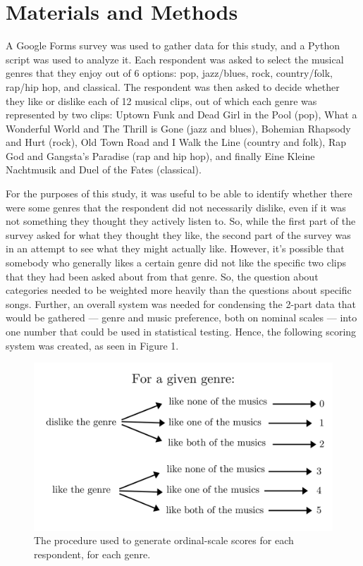\documentclass[12pt]{report}
\begin{document}
\chapter*{Materials and Methods}
A Google Forms survey was used to gather data for this study, and a Python script was used to analyze it. Each respondent was asked to select the musical genres that they enjoy out of 6 options: pop, jazz/blues, rock, country/folk, rap/hip hop, and classical. The respondent was then asked to decide whether they like or dislike each of 12 musical clips, out of which each genre was represented by two clips: Uptown Funk and Dead Girl in the Pool (pop), What a Wonderful World and The Thrill is Gone (jazz and blues), Bohemian Rhapsody and Hurt (rock), Old Town Road and I Walk the Line (country and folk), Rap God and Gangsta's Paradise (rap and hip hop), and finally Eine Kleine Nachtmusik and Duel of the Fates (classical).

For the purposes of this study, it was useful to be able to identify whether there were some genres that the respondent did not necessarily dislike, even if it was not something they thought they actively listen to. So, while the first part of the survey asked for what they thought they like, the second part of the survey was in an attempt to see what they might actually like. However, it's possible that somebody who generally likes a certain genre did not like the specific two clips that they had been asked about from that genre. So, the question about categories needed to be weighted more heavily than the questions about specific songs. Further, an overall system was needed for condensing the 2-part data that would be gathered --- genre and music preference, both on nominal scales --- into one number that could be used in statistical testing. Hence, the following scoring system was created, as seen in Figure 1.

\begin{figure}[h!]
  \centerline{\includegraphics[width=0.5\linewidth]{matrix.png}}
  \caption{\small The procedure used to generate ordinal-scale scores for each respondent, for each genre.}
\end{figure}
\end{document}
